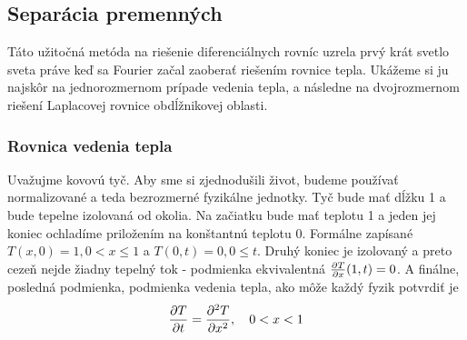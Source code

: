 \subsection{Separácia premenných}

Táto užitočná metóda na riešenie diferenciálnych rovníc uzrela prvý
krát svetlo sveta práve keď sa Fourier začal zaoberať riešením rovnice
tepla. Ukážeme si ju najskôr na jednorozmernom prípade vedenia tepla,
a následne na dvojrozmernom riešení Laplacovej rovnice obdĺžnikovej
oblasti.

\subsubsection{Rovnica vedenia tepla}

Uvažujme kovovú tyč. Aby sme si zjednodušili život, budeme používať
normalizované a teda bezrozmerné fyzikálne jednotky. Tyč bude mať
dĺžku 1 a bude tepelne izolovaná od okolia. Na začiatku bude mať
teplotu 1 a jeden jej koniec ochladíme priložením na konštantnú
teplotu 0. Formálne zapísané
$T(x,0) = 1, 0<x\le1$ a $T(0,t)=0, 0\le t$. 
Druhý koniec je izolovaný a preto
cezeň nejde žiadny tepelný tok - podmienka ekvivalentná
$\frac{\partial T}{\partial x}(1,t)=0$. A finálne, posledná podmienka, podmienka
vedenia tepla, ako môže každý fyzik potvrdiť je
\begin{equation}
    \frac{\partial T}{\partial t} = \frac{\partial^2 T}{\partial x^2}, \quad0<x<1
    \label{eq:heat}
\end{equation}

